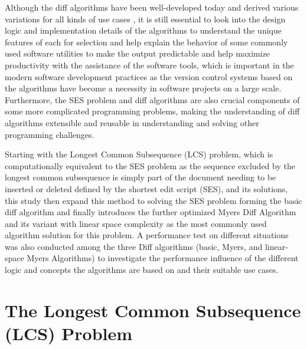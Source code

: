 \documentclass[sigplan,screen]{acmart}
\begin{document}
Although the diff algorithms have been well-developed today and derived various variations for all kinds of use cases \cite{khannaFormalInvestigationDiff32007}, it is still essential to look into the design logic and implementation details of the algorithms to understand the unique features of each for selection and help explain the behavior of some commonly used software utilities to make the output predictable and help maximize productivity with the assistance of the software tools, which is important in the modern software development practices as the version control systems based on the algorithms \cite{rochkindSourceCodeControl1975a} have become a necessity in software projects on a large scale. Furthermore, the SES problem and diff algorithms are also crucial components of some more complicated programming problems, making the understanding of diff algorithms extensible and reusable in understanding and solving other programming challenges.

Starting with the Longest Common Subsequence (LCS) problem, which is computationally equivalent to the SES problem \cite{bergrothSurveyLongestCommon2000, lijuAlgorithmDeriveShortest2022, masekFasterAlgorithmComputing1980, myersAnONDDifference1986, patersonLongestCommonSubsequences1994} as the sequence excluded by the longest common subsequence is simply part of the document needing to be inserted or deleted defined by the shortest edit script (SES), and its solutions, this study then expand this method to solving the SES problem forming the basic diff algorithm \cite{wagnerStringtoStringCorrectionProblem1974} and finally introduces the further optimized Myers Diff Algorithm\cite{myersAnONDDifference1986} and its variant with linear space complexity \cite{myersAnONDDifference1986} as the most commonly used algorithm solution for this problem. A performance test on different situations was also conducted among the three Diff algorithms (basic, Myers, and linear-space Myers Algorithms) to investigate the performance influence of the different logic and concepts the algorithms are based on and their suitable use cases.


\section{The Longest Common Subsequence (LCS) Problem}
\label{section:lcs}
\end{document}
